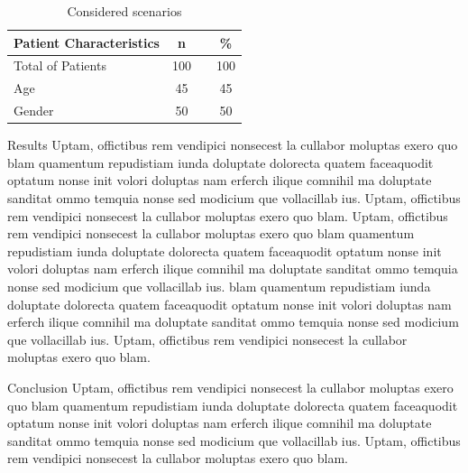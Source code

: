 \documentclass[final]{beamer}
\newlength{\onecolwid}
\begin{document}
\begin{frame}[t]
\begin{columns}[t]
\begin{column}{\onecolwid}
          \begin{table}[ht]
					\centering
					\begin{tabular}{lccc}
                    Patient Characteristics & n 		& & \%  \\
					\hline
					Total of Patients 		& 100     	& & 100 \\
					Age 	 				&  45      	& &  45 \\
					Gender 					&  50 	   	& &  50 \\
				    \hline
				  \end{tabular}
				\caption{Considered scenarios} 
                \label{Patient and tumor Characteristics}
			  \end{table}
          
          
          \begin{block}{Results}
          Uptam, offictibus rem vendipici nonsecest la cullabor moluptas exero quo blam quamentum repudistiam iunda doluptate dolorecta quatem faceaquodit optatum nonse init volori doluptas nam erferch ilique comnihil ma doluptate sanditat ommo temquia nonse sed modicium que vollacillab ius. Uptam, offictibus rem vendipici nonsecest la cullabor moluptas exero quo blam.
Uptam, offictibus rem vendipici nonsecest la cullabor moluptas exero quo blam quamentum repudistiam iunda doluptate dolorecta quatem faceaquodit optatum nonse init volori doluptas nam erferch ilique comnihil ma doluptate sanditat ommo temquia nonse sed modicium que vollacillab ius. 
blam quamentum repudistiam iunda doluptate dolorecta quatem faceaquodit optatum nonse init volori doluptas nam erferch ilique comnihil ma doluptate sanditat ommo temquia nonse sed modicium que vollacillab ius. Uptam, offictibus rem vendipici nonsecest la cullabor moluptas exero quo blam.

          \end{block}
          
          
          \begin{block}{Conclusion}
          Uptam, offictibus rem vendipici nonsecest la cullabor moluptas exero quo blam quamentum repudistiam iunda doluptate dolorecta quatem faceaquodit optatum nonse init volori doluptas nam erferch ilique comnihil ma doluptate sanditat ommo temquia nonse sed modicium que vollacillab ius. Uptam, offictibus rem vendipici nonsecest la cullabor moluptas exero quo blam.
          \end{block}
          

\end{column}
\end{columns}
\end{frame}
\end{document}
